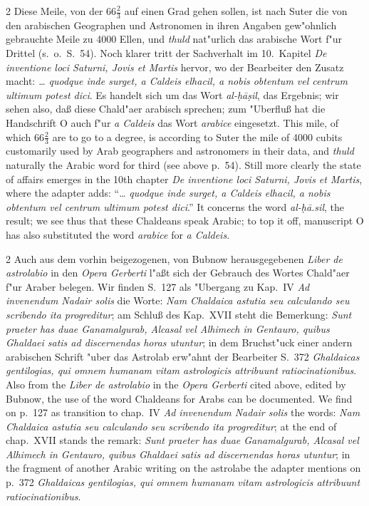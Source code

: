 \documentclass[10pt,a4paper]{article}
\renewcommand{\switchcolumn}{\syncronize\nointerlineskip\columnbreak}
\newcommand{\s}[1]{\d{#1}}
\begin{document}
\begin{paracol}{2}
Diese Meile, von der $66\frac{2}{3}$ auf einen Grad gehen sollen, ist nach Suter die von den arabischen Geographen und Astronomen in ihren Angaben gew"ohnlich gebrauchte Meile zu 4000 Ellen, und \textit{thuld} nat"urlich das arabische Wort f"ur Drittel (s.\ o.\ S.\ 54). Noch klarer tritt der Sachverhalt im 10.\ Kapitel \textit{De inventione loci Saturni, Jovis et Martis} hervor, wo der Bearbeiter den Zusatz macht: \textit{\ldots{} quodque inde surget, a Caldeis elhacil, a nobis obtentum vel centrum ultimum potest dici}. Es handelt sich um das Wort \textit{al-\d{h}\=a\s{s}il}, das Ergebnis; wir sehen also, da\ss{} diese Chald"aer arabisch sprechen; zum "Uberflu\ss{} hat die Handschrift O auch f"ur \textit{a Caldeis} das Wort \textit{arabice} eingesetzt.
\switchcolumn
This mile, of which $66\frac{2}{3}$ are to go to a degree, is according to Suter the mile of 4000 cubits customarily used by Arab geographers and astronomers in their data, and \textit{thuld} naturally the Arabic word for third (see above p.\ 54). Still more clearly the state of affairs emerges in the 10th chapter \textit{De inventione loci Saturni, Jovis et Martis}, where the adapter adds: ``\ldots{} \textit{quodque inde surget, a Caldeis elhacil, a nobis obtentum vel centrum ultimum potest dici}.'' It concerns the word \textit{al-\d{h}\=a.sil}, the result; we see thus that these Chaldeans speak Arabic; to top it off, manuscript O has also substituted the word \textit{arabice} for \textit{a Caldeis}.
\end{paracol}

\begin{paracol}{2}
Auch aus dem vorhin beigezogenen, von Bubnow herausgegebenen \textit{Liber de astrolabio} in den \textit{Opera Gerberti} l"a\ss{}t sich der Gebrauch des Wortes Chald"aer f"ur Araber belegen. Wir finden S.\ 127 als "Ubergang zu Kap.\ IV \textit{Ad invenendum Nadair solis} die Worte: \textit{Nam Chaldaica astutia seu calculando seu scribendo ita progreditur}; am Schlu\ss{} des Kap.\ XVII steht die Bemerkung: \textit{Sunt praeter has duae Ganamalgurab, Alcasal vel Alhimech in Gentauro, quibus Ghaldaei satis ad discernendas horas utuntur}; in dem Bruchst"uck einer andern arabischen Schrift "uber das Astrolab erw"ahnt der Bearbeiter S.\ 372 \textit{Ghaldaicas gentilogias, qui omnem humanam vitam astrologicis attribuunt ratiocinationibus}.
\switchcolumn
Also from the \textit{Liber de astrolabio} in the \textit{Opera Gerberti} cited above, edited by Bubnow, the use of the word Chaldeans for Arabs can be documented. We find on p.\ 127 as transition to chap.\ IV \textit{Ad invenendum Nadair solis} the words: \textit{Nam Chaldaica astutia seu calculando seu scribendo ita progreditur}; at the end of chap.\ XVII stands the remark: \textit{Sunt praeter has duae Ganamalgurab, Alcasal vel Alhimech in Gentauro, quibus Ghaldaei satis ad discernendas horas utuntur}; in the fragment of another Arabic writing on the astrolabe the adapter mentions on p.\ 372 \textit{Ghaldaicas gentilogias, qui omnem humanam vitam astrologicis attribuunt ratiocinationibus}.
\end{paracol}
\end{document}
